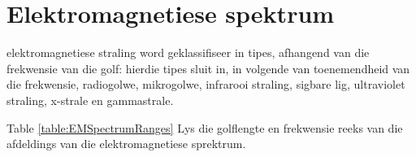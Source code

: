 \section{Elektromagnetiese spektrum}
            \nopagebreak
e\-lek\-tro\-mag\-ne\-tie\-se straling word geklassifiseer in tipes, afhangend van die frekwensie van die golf: hierdie tipes sluit in, in volgende van toenemendheid van die frekwensie, radiogolwe, mikrogolwe, infrarooi straling, sigbare lig, ultraviolet straling, x-strale en gammastrale. \par 
            \nopagebreak
      


      \label{m38778*id187332}Table \ref{table:EMSpectrumRanges} Lys die golflengte en frekwensie reeks van die afdeldings van die elektromagnetiese sprektrum.\par 
